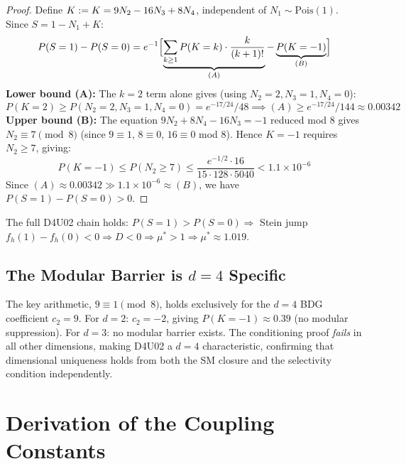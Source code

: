 \documentclass[12pt,a4paper]{article}
\begin{document}
\begin{proof}
Define $K := K = 9N_2 - 16N_3 + 8N_4$, independent of $N_1 \sim \mathrm{Pois}(1)$.  Since $S = 1 - N_1 + K$:
\begin{equation}
  P(S=1) - P(S=0) = e^{-1}\Bigl[\underbrace{\sum_{k\geq 1} P(K=k)\cdot\frac{k}{(k+1)!}}_{(A)} - \underbrace{P(K=-1)}_{(B)}\Bigr]
  \label{eq:d4u02_master}
\end{equation}
\textbf{Lower bound (A):} The $k=2$ term alone gives (using $N_2=2, N_3=1, N_4=0$):
\begin{equation}
  P(K=2) \geq P(N_2=2,N_3=1,N_4=0) = e^{-17/24}/48 \implies (A) \geq e^{-17/24}/144 \approx 0.00342
\end{equation}
\textbf{Upper bound (B):} The equation $9N_2 + 8N_4 - 16N_3 = -1$ reduced mod $8$ gives $N_2 \equiv 7\pmod{8}$ (since $9\equiv 1$, $8\equiv 0$, $16\equiv 0$ mod $8$).  Hence $K=-1$ requires $N_2 \geq 7$, giving:
\begin{equation}
  P(K=-1) \leq P(N_2 \geq 7) \leq \frac{e^{-1/2}\cdot 16}{15\cdot 128 \cdot 5040} < 1.1\times10^{-6}
\end{equation}
Since $(A) \approx 0.00342 \gg 1.1\times10^{-6} \approx (B)$, we have $P(S=1)-P(S=0) > 0$. \end{proof}

\begin{corollary}
The full D4U02 chain holds: $P(S=1)>P(S=0) \Rightarrow$ Stein jump $f_h(1)-f_h(0)<0 \Rightarrow D < 0 \Rightarrow \mu^* > 1 \Rightarrow \mu^* \approx 1.019$.
\end{corollary}

\subsection{The Modular Barrier is $d=4$ Specific}

The key arithmetic, $9\equiv 1\pmod{8}$, holds exclusively for the $d=4$ BDG coefficient $c_2=9$.  For $d=2$: $c_2=-2$, giving $P(K=-1) \approx 0.39$ (no modular suppression).  For $d=3$: no modular barrier exists.  The conditioning proof \emph{fails} in all other dimensions, making D4U02 a $d=4$ characteristic, confirming that dimensional uniqueness holds from both the SM closure and the selectivity condition independently.

\section{Derivation of the Coupling Constants}\label{sec:couplings}
\end{document}
